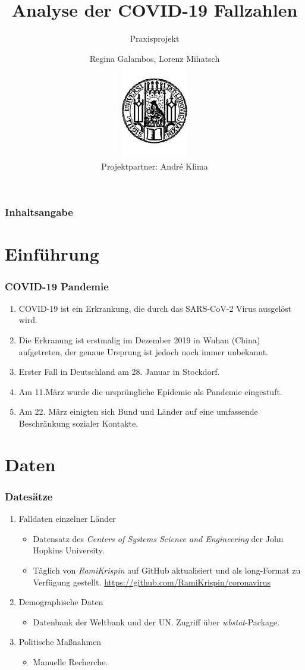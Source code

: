 \documentclass{beamer}
\title[Praxisprojekt: COVID-19]{Analyse der COVID-19 Fallzahlen}
\subtitle{Praxisprojekt}
\author[R.Galambos, L.Mihatsch]{Regina Galambos, Lorenz Mihatsch\\
	\includegraphics[width=0.22\textwidth]{LMU.pdf}\\
	{\small Projektpartner: Andr\'{e} Klima}}
\begin{document}
\begin{frame}
	\titlepage
\end{frame}

\begin{frame}
   \frametitle{Inhaltsangabe}
   \tableofcontents
 \end{frame}
 
 
 \section{Einführung}
 \begin{frame}
 	\frametitle{COVID-19 Pandemie}
 	\begin{enumerate}
 		\item COVID-19 ist ein Erkrankung, die durch das SARS-CoV-2 Virus ausgelöst wird.
 		\item Die Erkranung ist erstmalig im Dezember 2019 in Wuhan (China) aufgetreten, der genaue Ursprung ist jedoch noch immer unbekannt.
 		\item Erster Fall in Deutschland am 28. Januar in Stockdorf.
 		\item Am 11.März wurde die ursprüngliche Epidemie als Pandemie eingestuft.
 		\item Am 22. März einigten sich Bund und Länder auf eine umfassende Beschränkung sozialer Kontakte.
 	\end{enumerate}
 \end{frame}
 \section{Daten}
  
 \begin{frame}
 	\frametitle{Datesätze}
 	\begin{enumerate}
 		\item Falldaten einzelner Länder
 		\begin{itemize}
 			\item Datensatz des \emph{Centers of Systems Science and Engineering} der John Hopkins University. 
 			\item Täglich von \emph{RamiKrispin} auf GitHub aktualisiert und als long-Format zu Verfügung gestellt. \url{https://github.com/RamiKrispin/coronavirus}
 		\end{itemize}
 		\item Demographische Daten
 		\begin{itemize}
 			\item Datenbank der Weltbank und der UN. Zugriff über \emph{wbstat}-Package.
 		\end{itemize}
 		\item Politische Maßnahmen
 		\begin{itemize}
 			\item Manuelle Recherche.
 		\end{itemize}
 	\end{enumerate} 
 \end{frame}
\end{document}
